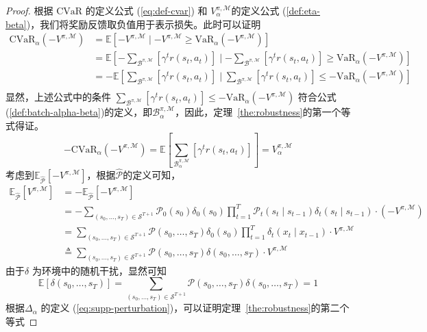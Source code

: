 \begin{proof}
根据 $\mathrm{CVaR}$ 的定义公式 (\ref{eq:def-cvar}) 和 $V_\alpha^{\pi,\mathcal{M}}$的定义公式
(\ref{def:eta-beta})，我们将奖励反馈取负值用于表示损失。此时可以证明
\begin{align*}
\mathrm{CVaR}_\alpha(-V^{\pi,\mathcal{M}}) &= \mathbb{E}\left[-V^{\pi,\mathcal{M}}\mid -V^{\pi,\mathcal{M}} \geq \mathrm{VaR}_\alpha(-V^{\pi,\mathcal{M}})\right]\\
&=\mathbb{E}\left[-{\sum}_{\mathcal{B}^{\pi,\mathcal{M}}}\left[\gamma^t r(s_t,a_t)\right]\mid -{\sum}_{\mathcal{B}^{\pi,\mathcal{M}}}\left[\gamma^t r(s_t,a_t)\right] \geq \mathrm{VaR}_\alpha(-V^{\pi,\mathcal{M}})\right]\\
&=-\mathbb{E}\left[{\sum}_{\mathcal{B}^{\pi,\mathcal{M}}}\left[\gamma^t r(s_t,a_t)\right]\mid {\sum}_{\mathcal{B}^{\pi,\mathcal{M}}}\left[\gamma^t r(s_t,a_t)\right] \leq -\mathrm{VaR}_\alpha(-V^{\pi,\mathcal{M}})\right]\\
\end{align*}
显然，上述公式中的条件 ${\sum}_{\mathcal{B}^{\pi,\mathcal{M}}}\left[\gamma^t r(s_t,a_t)\right] \leq -\mathrm{VaR}_\alpha(-V^{\pi,\mathcal{M}})$ 符合公式(\ref{def:batch-alpha-beta})的定义，即$\mathcal{B}_\alpha^{\pi,\mathcal{M}}$，因此，定理~\ref{the:robustness}的第一个等式得证。
\begin{equation}
-\mathrm{CVaR}_\alpha(-V^{\pi,\mathcal{M}}) = \mathbb{E}\left[{\sum}_{\mathcal{B}_\alpha^{\pi,\mathcal{M}}}\left[\gamma^t r(s_t,a_t)\right]\right] = V_\alpha^{\pi,\mathcal{M}}
\end{equation}
考虑到$\mathbb{E}_{\hat{\mathcal{P}}}[-V^{\pi,\mathcal{M}}]$，根据$\hat{\mathcal{P}}$的定义可知，
\begin{align*}
    \mathbb{E}_{\hat{\mathcal{P}}}[V^{\pi,\mathcal{M}}] &= -\mathbb{E}_{\hat{\mathcal{P}}}[-V^{\pi,\mathcal{M}}]\\
    &= -\sum_{(s_0,\ldots,s_T)\in\mathcal{S}^{T+1}}\mathcal{P}_0(s_0)\delta_0(s_0)\prod_{t=1}^{T}\mathcal{P}_t(s_t\mid s_{t-1})\delta_t(s_t\mid s_{t-1})\cdot (-V^{\pi,\mathcal{M}})\\
    &= \sum_{(s_0,\ldots,s_T)\in\mathcal{S}^{T+1}}\mathcal{P}(s_0,\ldots,s_T)\delta_0(s_0)\prod_{t=1}^{T}\delta_t(x_t\mid x_{t-1})\cdot V^{\pi,\mathcal{M}}\\
    &\triangleq \sum_{(s_0,\ldots,s_T)\in\mathcal{S}^{T+1}}\mathcal{P}(s_0,\ldots,s_T)\delta(s_0,\ldots,s_T)\cdot V^{\pi,\mathcal{M}}
\end{align*}
由于$\delta$ 为环境中的随机干扰，显然可知
\begin{equation}\label{eq:delta-exp}
    \mathbb{E}\left[\delta(s_0,\ldots,s_T)\right] = \sum_{(s_0,\ldots,s_T)\in\mathcal{S}^{T+1}}\mathcal{P}(s_0,\ldots,s_T)\delta(s_0,\ldots,s_T) = 1
\end{equation}
根据$\Delta_\alpha$ 的定义 (\ref{eq:supp-perturbation})，可以证明定理~\ref{the:robustness}的第二个等式


\end{proof}
